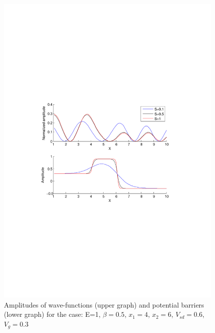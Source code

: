 \documentclass[•]{beamer}
\theoremstyle{remark}
\begin{document}
\begin{frame}
\begin{figure}[h!]
\centering
\includegraphics[scale=0.4]{test2}
\caption{Amplitudes of wave-functions (upper graph) and potential barriers (lower graph) for the case: E=1, $\beta=0.5$, $x_1=4$, $x_2=6$, $V_{sd}=0.6$, $V_g=0.3$}
\label{fig:test2}
\end{figure}
\end{frame}
\end{document}
